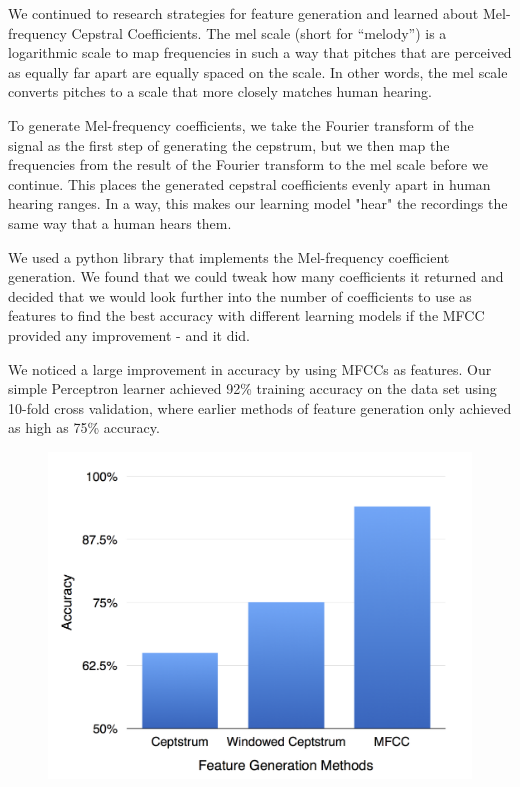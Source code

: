 \documentclass{article}
\begin{document}
We continued to research strategies for feature generation and learned about Mel-frequency Cepstral Coefficients. The mel scale (short for “melody”) is a logarithmic scale to map frequencies in such a way that pitches that are perceived as equally far apart are equally spaced on the scale. In other words, the mel scale converts pitches to a scale that more closely matches human hearing.

To generate Mel-frequency coefficients, we take the Fourier transform of the signal as the first step of generating the cepstrum, but we then map the frequencies from the result of the Fourier transform to the mel scale before we continue. This places the generated cepstral coefficients evenly apart in human hearing ranges. In a way, this makes our learning model "hear" the recordings the same way that a human hears them.

We used a python library that implements the Mel-frequency coefficient generation. We found that we could tweak how many coefficients it returned and decided that we would look further into the number of coefficients to use as features to find the best accuracy with different learning models if the MFCC provided any improvement - and it did.

We noticed a large improvement in accuracy by using MFCCs as features. Our simple Perceptron learner achieved 92\% training accuracy on the data set using 10-fold cross validation, where earlier methods of feature generation only achieved as high as 75\% accuracy.

\begin{figure}[H]
\includegraphics[width=\linewidth]{feature_generation_methods}
\end{figure}
\end{document}
